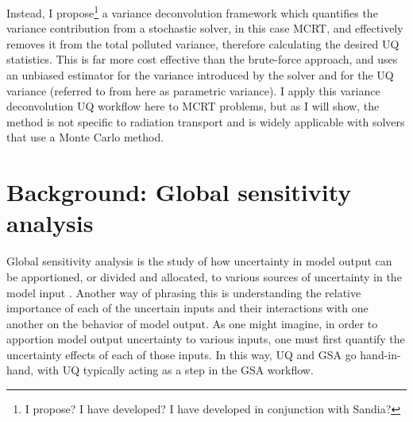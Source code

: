 Instead, I propose\footnote{I propose? I have developed? I have developed in conjunction with Sandia?} a variance deconvolution framework which quantifies the variance contribution from a stochastic solver, in this case MCRT, and effectively removes it from the total polluted variance, therefore calculating the desired UQ statistics. This is far more cost effective than the brute-force approach, and uses an unbiased estimator for the variance introduced by the solver and for the UQ variance (referred to from here as parametric variance). I apply this variance deconvolution UQ workflow here to MCRT problems, but as I will show, the method is not specific to radiation transport and is widely applicable with solvers that use a Monte Carlo method. 

\section{Background: Global sensitivity analysis}\label{sec:background-gsa}
Global sensitivity analysis is the study of how uncertainty in model output can be apportioned, or divided and allocated, to various sources of uncertainty in the model input \cite{saltelli2004}. Another way of phrasing this is understanding the relative importance of each of the uncertain inputs and their interactions with one another on the behavior of model output. As one might imagine, in order to apportion model output uncertainty to various inputs, one must first quantify the uncertainty effects of each of those inputs. In this way, UQ and GSA go hand-in-hand, with UQ typically acting as a step in the GSA workflow. 

